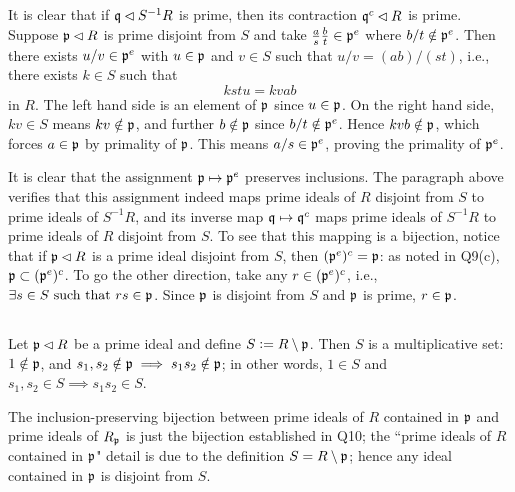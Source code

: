 \documentclass[12pt]{article}
\begin{document}
\subsection{} 
It is clear that if $\mathfrak{q} \lhd S^{-1}R$ is prime, then its contraction $\mathfrak{q}^{c} \lhd R$ is prime. 
Suppose $\mathfrak{p} \lhd R$ is prime disjoint from $S$ and take $\frac{a}{s} \frac{b}{t} \in \mathfrak{p}^{e}$ where $b / t \notin \mathfrak{p}^{e}$. 
Then there exists $u / v \in \mathfrak{p}^{e}$ with $u \in \mathfrak{p}$ and $v \in S$ such that $u/v = (ab)/(st)$, i.e., there exists $k \in S$ such that 
$$kstu = kvab$$ 
in $R$.
The left hand side is an element of $\mathfrak{p}$ since $u \in \mathfrak{p}$. 
On the right hand side, $kv \in S$ means $kv \notin \mathfrak{p}$, and further $b \notin \mathfrak{p}$ since $b / t \notin \mathfrak{p}^{e}$. 
Hence $kvb \notin \mathfrak{p}$, which forces $a \in \mathfrak{p}$ by primality of $\mathfrak{p}$. 
This means $a /s \in \mathfrak{p}^{e}$, proving the primality of $\mathfrak{p}^{e}$. 

It is clear that the assignment $\mathfrak{p} \mapsto \mathfrak{p}^{e}$ preserves inclusions. 
The paragraph above verifies that this assignment indeed maps prime ideals of $R$ disjoint from $S$ to prime ideals of $S^{-1}R$, and its inverse map $\mathfrak{q} \mapsto \mathfrak{q}^{c}$ maps prime ideals of $S^{-1}R$ to prime ideals of $R$ disjoint from $S$. 
To see that this mapping is a bijection, notice that if $\mathfrak{p} \lhd R$ is a prime ideal disjoint from $S$, then $(\mathfrak{p}^{e})^{c} = \mathfrak{p}$: 
as noted in Q9(c), $\mathfrak{p} \subset (\mathfrak{p}^{e})^{c}$. 
To go the other direction, take any $r \in (\mathfrak{p}^{e})^{c}$, i.e., 
$\exists s \in S \text{ such that } rs \in \mathfrak{p}$. 
Since $\mathfrak{p}$ is disjoint from $S$ and $\mathfrak{p}$ is prime, $r \in \mathfrak{p}$. 

\subsection{} 
Let $\mathfrak{p} \lhd R$ be a prime ideal and define $S \vcentcolon= R \setminus \mathfrak{p}$. 
Then $S$ is a multiplicative set: 
$1 \notin \mathfrak{p}$, and $s_1, s_2 \notin \mathfrak{p} \implies s_1 s_2 \notin \mathfrak{p}$; 
in other words, $1 \in S$ and $s_1, s_2 \in S \implies s_1 s_2 \in S$. 

The inclusion-preserving bijection between prime ideals of $R$ contained in $\mathfrak{p}$ and prime ideals of $R_{\mathfrak{p}}$ is just the bijection established in Q10;
the ``prime ideals of $R$ contained in $\mathfrak{p}$" detail is due to the definition $S = R \setminus \mathfrak{p}$; 
hence any ideal contained in $\mathfrak{p}$ is disjoint from $S$. 
\end{document}

